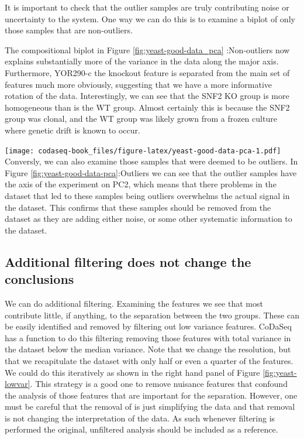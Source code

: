 \documentclass[
  onecolumn]{article}
\begin{document}
It is important to check that the outlier samples are truly contributing noise or uncertainty to the system. One way we can do this is to examine a biplot of only those samples that are non-outliers.

The compositional biplot in Figure \ref{fig:yeast-good-data_pca} :Non-outliers now explains substantially more of the variance in the data along the major axis. Furthermore, YOR290-c the knockout feature is separated from the main set of features much more obviously, suggesting that we have a more informative rotation of the data. Interestingly, we can see that the SNF2 KO group is more homogeneous than is the WT group. Almost certainly this is because the SNF2 group was clonal, and the WT group was likely grown from a frozen culture where genetic drift is known to occur.

\texttt{[image: codaseq-book\_files/figure-latex/yeast-good-data-pca-1.pdf]}
Conversly, we can also examine those samples that were deemed to be outliers. In Figure \ref{fig:yeast-good-data-pca}:Outliers we can see that the outlier samples have the axis of the experiment on PC2, which means that there problems in the dataset that led to these samples being outliers overwhelms the actual signal in the dataset. This confirms that these samples should be removed from the dataset as they are adding either noise, or some other systematic information to the dataset.

\clearpage

\hypertarget{additional-filtering-does-not-change-the-conclusions}{%
\subsection{Additional filtering does not change the conclusions}\label{additional-filtering-does-not-change-the-conclusions}}

We can do additional filtering. Examining the features we see that most contribute little, if anything, to the separation between the two groups. These can be easily identified and removed by filtering out low variance features. CoDaSeq has a function to do this filtering removing those features with total variance in the dataset below the median variance. Note that we change the resolution, but that we recapitulate the dataset with only half or even a quarter of the features. We could do this iteratively as shown in the right hand panel of Figure \ref{fig:yeast-lowvar}. This strategy is a good one to remove nuisance features that confound the analysis of those features that are important for the separation. However, one must be careful that the removal of is just simplifying the data and that removal is not changing the interpretation of the data. As such whenever filtering is performed the original, unfiltered analysis should be included as a reference.
\end{document}
